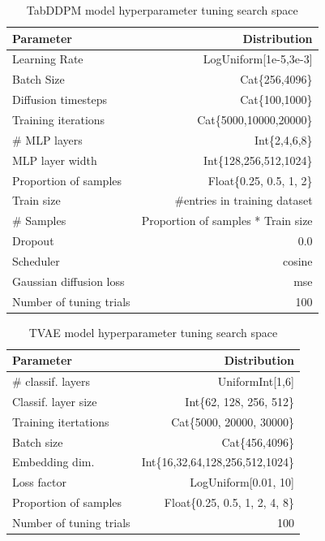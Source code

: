\begin{table}[h]
	\centering
	\begin{tabular}{lr}
		\toprule
		Parameter               & Distribution                       \\
		\midrule
		Learning Rate           & LogUniform[1e-5,3e-3]              \\
		Batch Size              & Cat\{256,4096\}                    \\
		Diffusion timesteps     & Cat\{100,1000\}                    \\
		Training iterations     & Cat\{5000,10000,20000\}            \\
		\# MLP layers           & Int\{2,4,6,8\}                     \\
		MLP layer width         & Int\{128,256,512,1024\}            \\
		Proportion of samples   & Float\{0.25, 0.5, 1, 2\}           \\
		\midrule
		Train size              & \#entries in training dataset      \\
		\# Samples              & Proportion of samples * Train size \\
		Dropout                 & 0.0                                \\
		Scheduler               & cosine                             \\
		Gaussian diffusion loss & mse                                \\
		\midrule
		Number of tuning trials & 100                                \\
		\bottomrule
	\end{tabular}
	\caption{TabDDPM model hyperparameter tuning search space}
	\label{tab:diff_tune}
\end{table}



\begin{table}[h]
	\centering
	\begin{tabular}{lr}
		\toprule
		Parameter               & Distribution                     \\
		\midrule
		\# classif. layers      & UniformInt[1,6]                  \\
		Classif. layer size     & Int\{62, 128, 256, 512\}         \\
		Training itertations    & Cat\{5000, 20000, 30000\}        \\
		Batch size              & Cat\{456,4096\}                  \\
		Embedding dim.          & Int\{16,32,64,128,256,512,1024\} \\
		Loss factor             & LogUniform[0.01, 10]             \\
		Proportion of samples   & Float\{0.25, 0.5, 1, 2, 4, 8\}   \\
		\midrule
		Number of tuning trials & 100                              \\
		\bottomrule
	\end{tabular}
	\caption{TVAE model hyperparameter tuning search space}
	\label{tab:tvae_tune}

\end{table}

